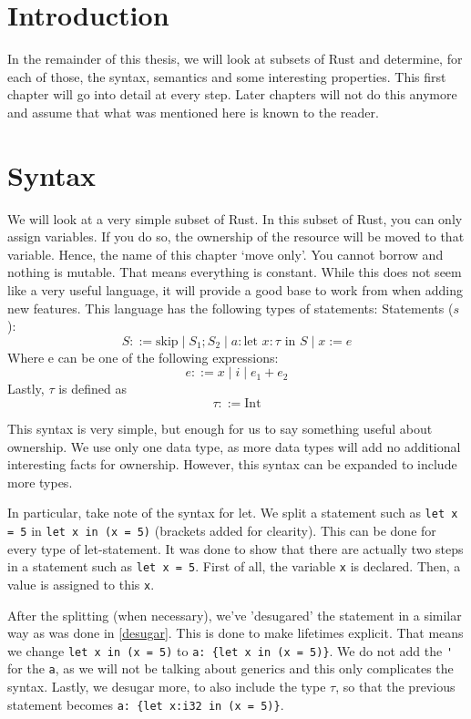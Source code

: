 \section{Introduction}
In the remainder of this thesis, we will look at subsets of Rust and determine, for each of those, the syntax, semantics and some interesting properties. This first chapter will go into detail at every step. Later chapters will not do this anymore and assume that what was mentioned here is known to the reader. 

\section{Syntax}
We will look at a very simple subset of Rust. In this subset of Rust, you can only assign variables. If you do so, the ownership of the resource will be moved to that variable. Hence, the name of this chapter `move only'. 
You cannot borrow and nothing is mutable. That means everything is constant. While this does not seem like a very useful language, it will provide a good base to work from when adding new features. This language has the following types of statements:
Statements ($s$):
$$S ::= \textrm{skip} \mid S_1; S_2 \mid a: \textrm{let } x:\tau \textrm{ in } S \mid x := e$$
Where e can be one of the following expressions:
$$e ::= x \mid i \mid e_1 + e_2$$
Lastly, $\tau$ is defined as 
$$\tau ::= \textrm{Int}$$

This syntax is very simple, but enough for us to say something useful about ownership. We use only one data type, as more data types will add no additional interesting facts for ownership. However, this syntax can be expanded to include more types. 

In particular, take note of the syntax for let. We split a statement such as \verb|let x = 5| in \verb|let x in (x = 5)| (brackets added for clearity). This can be done for every type of let-statement. It was done to show that there are actually two steps in a statement such as \verb|let x = 5|. First of all, the variable \verb|x| is declared. Then, a value is assigned to this \verb|x|. 

After the splitting (when necessary), we've 'desugared' the statement in a similar way as was done in \ref{desugar}. This is done to make lifetimes explicit. That means we change \verb|let x in (x = 5)| to \verb|a: {let x in (x = 5)}|. We do not add the \verb|'| for the \verb|a|, as we will not be talking about generics and this only complicates the syntax. Lastly, we desugar more, to also include the type $\tau$, so that the previous statement becomes \verb|a: {let x:i32 in (x = 5)}|. 

